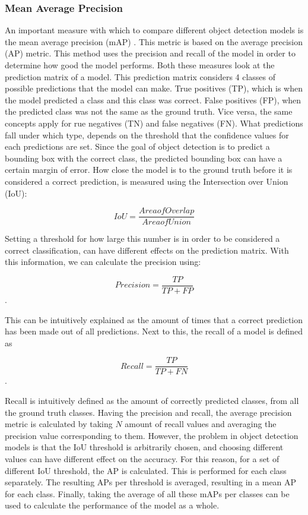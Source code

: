 \subsubsection{Mean Average Precision}
An important measure with which to compare different object detection models is 
the mean average precision (mAP) \cite{mAP}. This metric is based on the average 
precision (AP) metric. This method uses the precision and recall of the model 
in order to determine how good the model performs. Both these measures look 
at the prediction matrix of a model. This prediction matrix considers 4 classes 
of possible predictions that the model can make. True positives (TP), which is when 
the model predicted a class and this class was correct. False positives (FP), when the 
predicted class was not the same as the ground truth. Vice versa, the same concepts 
apply for rue negatives (TN) and false negatives (FN). What predictions fall under 
which type, depends on the threshold that the confidence values for each predictions 
are set. Since the goal of object detection is to predict a bounding box with the 
correct class, the predicted bounding box can have a certain margin of error. How 
close the model is to the ground truth before it is considered a correct prediction, 
is measured using the Intersection over Union (IoU):

\begin{equation}
    IoU = \frac{Area of Overlap}{Area of Union}
\end{equation}

Setting a threshold for how large this number is in order to be considered a 
correct classification, can have different effects on the prediction matrix. 
With this information, we can calculate the precision using: 

\begin{equation}
    Precision = \frac{TP}{TP + FP}
\end{equation}.

This can be intuitively explained as the amount of times that a correct prediction 
has been made out of all predictions. Next to this, the recall of a model is defined as 

\begin{equation}
    Recall = \frac{TP}{TP + FN}
\end{equation}.

Recall is intuitively defined as the amount of correctly predicted classes, 
from all the ground truth classes. Having the precision and recall, the average 
precision metric is calculated by taking $N$ amount of recall values and averaging 
the precision value corresponding to them. However, the problem in object detection 
models is that the IoU threshold is arbitrarily chosen, and choosing different 
values can have different effect on the accuracy. For this reason, for a set of 
different IoU threshold, the AP is calculated. This is performed for each class separately.
The resulting APs per threshold is averaged, resulting in a mean AP for each class. 
Finally, taking the average of all these mAPs per classes can be used to calculate the 
performance of the model as a whole. 



